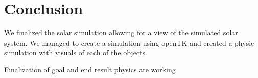 \section{Conclusion}
We finalized the solar simulation allowing for a view of the simulated solar system. 
We managed to create a simulation using openTK and created a physic simulation with visuals of each of the objects.

Finalization of goal and end result
physics are working